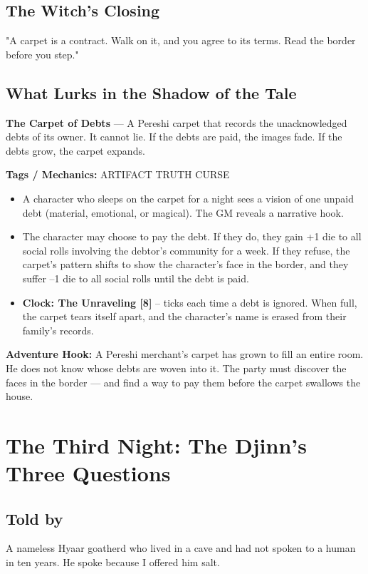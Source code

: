 \documentclass[10pt,twoside]{book}
\newcommand{\tag}[1]{\textsc{#1}}
\begin{document}
\section*{The Witch's Closing}
"A carpet is a contract. Walk on it, and you agree to its terms. Read the border before you step."

\section*{What Lurks in the Shadow of the Tale}
\begin{infobox}
\textbf{The Carpet of Debts} --- A Pereshi carpet that records the unacknowledged debts of its owner. It cannot lie. If the debts are paid, the images fade. If the debts grow, the carpet expands.

\textbf{Tags / Mechanics:} \tag{ARTIFACT} \tag{TRUTH} \tag{CURSE}

\begin{itemize}
\item A character who sleeps on the carpet for a night sees a vision of one unpaid debt (material, emotional, or magical). The GM reveals a narrative hook.
\item The character may choose to pay the debt. If they do, they gain +1 die to all social rolls involving the debtor's community for a week. If they refuse, the carpet's pattern shifts to show the character's face in the border, and they suffer --1 die to all social rolls until the debt is paid.
\item \textbf{Clock: The Unraveling [8]} -- ticks each time a debt is ignored. When full, the carpet tears itself apart, and the character's name is erased from their family's records.
\end{itemize}

\textbf{Adventure Hook:} A Pereshi merchant's carpet has grown to fill an entire room. He does not know whose debts are woven into it. The party must discover the faces in the border --- and find a way to pay them before the carpet swallows the house.
\end{infobox}

\chapter{The Third Night: The Djinn's Three Questions}

\section*{Told by}
A nameless Hyaar goatherd who lived in a cave and had not spoken to a human in ten years. He spoke because I offered him salt.
\end{document}
